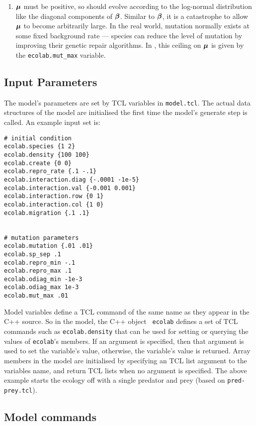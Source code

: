 \begin{enumerate}
\item $\mbox{\boldmath{$\mu$}}$ must be positive, so should evolve according to the
  log-normal distribution like the diagonal components of $\mbox{\boldmath{$\beta$}}$.
  Similar to $\mbox{\boldmath{$\beta$}}$, it is a catastrophe to allow $\mbox{\boldmath{$\mu$}}$ to become
  arbitrarily large. In the real world, mutation normally exists at
  some fixed background rate --- species can reduce the level of
  mutation by improving their genetic repair algorithms. In \EcoLab{},
  this ceiling on $\mbox{\boldmath{$\mu$}}$ is given by the
  \verb|ecolab.mut_max| variable.

\end{enumerate}

\subsection{Input Parameters}\label{input parameters}

The model's parameters are set by TCL variables in {\tt model.tcl}.
The actual data structures of the model are initialised the first time
the model's generate step is called. An example input set is:
\begin{verbatim}
# initial condition
ecolab.species {1 2}
ecolab.density {100 100} 
ecolab.create {0 0}
ecolab.repro_rate {.1 -.1}
ecolab.interaction.diag {-.0001 -1e-5}
ecolab.interaction.val {-0.001 0.001}
ecolab.interaction.row {0 1}
ecolab.interaction.col {1 0}
ecolab.migration {.1 .1}


# mutation parameters
ecolab.mutation {.01 .01}
ecolab.sp_sep .1
ecolab.repro_min -.1
ecolab.repro_max .1
ecolab.odiag_min -1e-3
ecolab.odiag_max 1e-3
ecolab.mut_max .01
\end{verbatim}

Model variables define a TCL command of the same name as they appear
in the C++ source. So in the \EcoLab{} model, the C++ object {\tt
  ecolab} defines a set of TCL commands such as {\tt ecolab.density}
that can be used for setting or querying the values of {\tt ecolab}'s
members.  If an argument is specified, then that argument is used to
set the variable's value, otherwise, the variable's value is returned.
Array members in the model are initialised by specifying an TCL list
argument to the variables name, and return TCL lists when no argument
is specified. The above example starts the ecology off with a single
predator and prey (based on {\tt pred-prey.tcl}).

\subsection{\protect\EcoLab{} Model commands}


